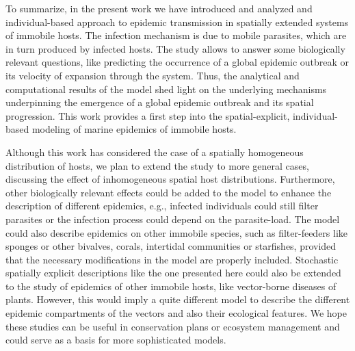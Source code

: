 To summarize, in the present work we have introduced and analyzed and
individual-based approach to epidemic transmission in spatially extended
systems of immobile hosts. The infection mechanism is due to mobile parasites,
which are in turn produced by infected hosts. The study allows to answer some
biologically relevant questions, like predicting the occurrence of a global
epidemic outbreak or its velocity of expansion through the system. Thus, the
analytical and computational results of the model shed light on the underlying
mechanisms underpinning the emergence of a global epidemic outbreak and its
spatial progression. This work provides a first step into the spatial-explicit,
individual-based modeling of marine epidemics of immobile hosts.

Although this work has considered the case of a spatially homogeneous
distribution of hosts, we plan to extend the study to more general cases,
discussing the effect of inhomogeneous spatial host distributions. Furthermore,
other biologically relevant effects could be added to the model to enhance the
description of different epidemics, e.g., infected individuals could still
filter parasites or the infection process could depend on the parasite-load.
The model could also describe epidemics on other immobile species, such as
filter-feeders like sponges or other bivalves, corals, intertidal communities
or starfishes, provided that the necessary modifications in the model are
properly included. Stochastic spatially explicit descriptions like the one
presented here could also be extended to the study of epidemics of other
immobile hosts, like vector-borne diseases of plants. However, this would imply
a quite different model to describe the different epidemic compartments of the
vectors and also their ecological features. We hope these studies can be useful
in conservation plans or ecosystem management and could serve as a basis for
more sophisticated models.